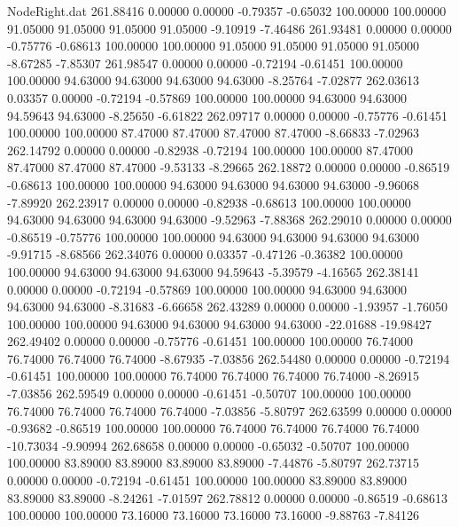 \begin{filecontents}{NodeRight.dat}
 261.88416    0.00000    0.00000    -0.79357   -0.65032  100.00000  100.00000   91.05000   91.05000   91.05000   91.05000   -9.10919   -7.46486
 261.93481    0.00000    0.00000    -0.75776   -0.68613  100.00000  100.00000   91.05000   91.05000   91.05000   91.05000   -8.67285   -7.85307
 261.98547    0.00000    0.00000    -0.72194   -0.61451  100.00000  100.00000   94.63000   94.63000   94.63000   94.63000   -8.25764   -7.02877
 262.03613    0.03357    0.00000    -0.72194   -0.57869  100.00000  100.00000   94.63000   94.63000   94.59643   94.63000   -8.25650   -6.61822
 262.09717    0.00000    0.00000    -0.75776   -0.61451  100.00000  100.00000   87.47000   87.47000   87.47000   87.47000   -8.66833   -7.02963
 262.14792    0.00000    0.00000    -0.82938   -0.72194  100.00000  100.00000   87.47000   87.47000   87.47000   87.47000   -9.53133   -8.29665
 262.18872    0.00000    0.00000    -0.86519   -0.68613  100.00000  100.00000   94.63000   94.63000   94.63000   94.63000   -9.96068   -7.89920
 262.23917    0.00000    0.00000    -0.82938   -0.68613  100.00000  100.00000   94.63000   94.63000   94.63000   94.63000   -9.52963   -7.88368
 262.29010    0.00000    0.00000    -0.86519   -0.75776  100.00000  100.00000   94.63000   94.63000   94.63000   94.63000   -9.91715   -8.68566
 262.34076    0.00000    0.03357    -0.47126   -0.36382  100.00000  100.00000   94.63000   94.63000   94.63000   94.59643   -5.39579   -4.16565
 262.38141    0.00000    0.00000    -0.72194   -0.57869  100.00000  100.00000   94.63000   94.63000   94.63000   94.63000   -8.31683   -6.66658
 262.43289    0.00000    0.00000    -1.93957   -1.76050  100.00000  100.00000   94.63000   94.63000   94.63000   94.63000  -22.01688  -19.98427
 262.49402    0.00000    0.00000    -0.75776   -0.61451  100.00000  100.00000   76.74000   76.74000   76.74000   76.74000   -8.67935   -7.03856
 262.54480    0.00000    0.00000    -0.72194   -0.61451  100.00000  100.00000   76.74000   76.74000   76.74000   76.74000   -8.26915   -7.03856
 262.59549    0.00000    0.00000    -0.61451   -0.50707  100.00000  100.00000   76.74000   76.74000   76.74000   76.74000   -7.03856   -5.80797
 262.63599    0.00000    0.00000    -0.93682   -0.86519  100.00000  100.00000   76.74000   76.74000   76.74000   76.74000  -10.73034   -9.90994
 262.68658    0.00000    0.00000    -0.65032   -0.50707  100.00000  100.00000   83.89000   83.89000   83.89000   83.89000   -7.44876   -5.80797
 262.73715    0.00000    0.00000    -0.72194   -0.61451  100.00000  100.00000   83.89000   83.89000   83.89000   83.89000   -8.24261   -7.01597
 262.78812    0.00000    0.00000    -0.86519   -0.68613  100.00000  100.00000   73.16000   73.16000   73.16000   73.16000   -9.88763   -7.84126

\end{filecontents}
